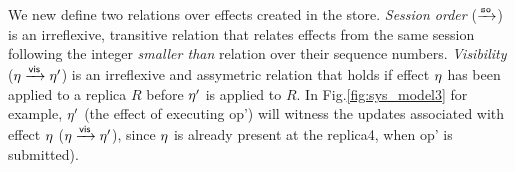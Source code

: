 We new define two relations over effects created in the store.
\emph{Session order} ($\xrightarrow{{\normalfont \texttt{so}}}$) is an irreflexive, transitive relation that relates
effects from the same session following the integer \emph{smaller
than} relation over their sequence numbers.  \emph{Visibility} ($\eta
\xrightarrow{{\normalfont \textsf{vis}}} \eta'$) is an
irreflexive and assymetric relation that holds if effect $\eta$ has
been applied to a replica $R$ before $\eta'$ is applied to $R$.  In
Fig.\ref{fig:sys_model3} for example, $\eta'$ (the effect of executing
op') will witness the updates associated with effect $\eta$
($\eta \xrightarrow{{\normalfont \textsf{vis}}} \eta'$), since $\eta$ is already present at
the replica4, when op' is submitted).

















































































